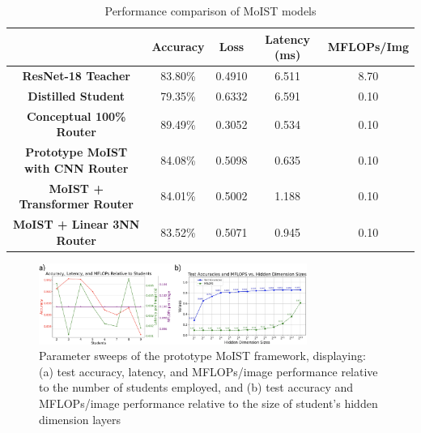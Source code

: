 \documentclass[conference]{IEEEtran}
\begin{document}
\begin{table}[!t]
  \renewcommand{\arraystretch}{1.1}
  \centering
  \caption{Performance comparison of MoIST models}
  \label{table:performance_comparison}
  \begin{adjustbox}{width=0.425\textwidth}
    \small
    \begin{tabular}{|c|c|c|c|c|}
      \hline
                                               & \textbf{Accuracy} & \textbf{Loss} & \textbf{Latency (ms)} & \textbf{MFLOPs/Img} \\ \hline
      \textbf{ResNet-18 Teacher}               & 83.80\%           & 0.4910        & 6.511                 & 8.70                \\ \hline
      \textbf{Distilled Student}               & 79.35\%           & 0.6332        & 6.591                 & 0.10                \\ \hline
      \textbf{Conceptual 100\% Router}         & 89.49\%           & 0.3052        & 0.534                 & 0.10                \\ \hline
      \textbf{Prototype MoIST with CNN Router} & 84.08\%           & 0.5098        & 0.635                 & 0.10                \\ \hline
      \textbf{MoIST + Transformer Router}      & 84.01\%           & 0.5002        & 1.188                 & 0.10                \\ \hline
      \textbf{MoIST + Linear 3NN Router}       & 83.52\%           & 0.5071        & 0.945                 & 0.10                \\ \hline
    \end{tabular}
  \end{adjustbox}
\end{table}

\begin{figure}[ht!] %
  \centering
  \includegraphics[width=3.45in]{figures/param_sweeps.png}
  \caption{Parameter sweeps of the prototype MoIST framework, displaying: (a) test accuracy, latency, and MFLOPs/image performance relative to the number of students employed, and (b) test accuracy and MFLOPs/image performance relative to the size of student's hidden dimension layers}
  \label{param_sweep}
\end{figure}
\end{document}

